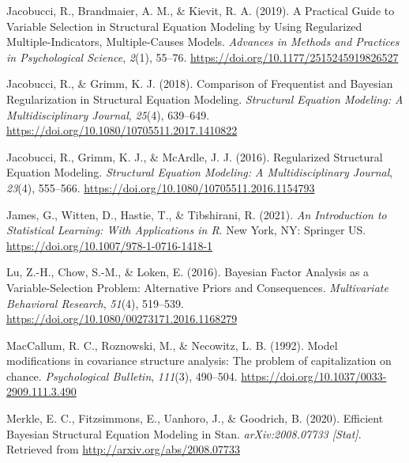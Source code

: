\documentclass[
  man, donotrepeattitle,floatsintext]{apa6}
\newlength{\cslhangindent}
\newlength{\cslentryspacingunit} %
\newenvironment{CSLReferences}[2] %
 {%
  \setlength{\parindent}{0pt}
  \ifodd #1
  \let\oldpar\par
  \def\par{\hangindent=\cslhangindent\oldpar}
  \fi
  \setlength{\parskip}{#2\cslentryspacingunit}
 }%
 {}
\begin{document}
\begin{CSLReferences}{1}{0}
\leavevmode{}%
Jacobucci, R., Brandmaier, A. M., \& Kievit, R. A. (2019). A {Practical} {Guide} to {Variable} {Selection} in {Structural} {Equation} {Modeling} by {Using} {Regularized} {Multiple}-{Indicators}, {Multiple}-{Causes} {Models}. \emph{Advances in Methods and Practices in Psychological Science}, \emph{2}(1), 55--76. \url{https://doi.org/10.1177/2515245919826527}

\leavevmode{}%
Jacobucci, R., \& Grimm, K. J. (2018). Comparison of {Frequentist} and {Bayesian} {Regularization} in {Structural} {Equation} {Modeling}. \emph{Structural Equation Modeling: A Multidisciplinary Journal}, \emph{25}(4), 639--649. \url{https://doi.org/10.1080/10705511.2017.1410822}

\leavevmode{}%
Jacobucci, R., Grimm, K. J., \& McArdle, J. J. (2016). Regularized {Structural} {Equation} {Modeling}. \emph{Structural Equation Modeling: A Multidisciplinary Journal}, \emph{23}(4), 555--566. \url{https://doi.org/10.1080/10705511.2016.1154793}

\leavevmode{}%
James, G., Witten, D., Hastie, T., \& Tibshirani, R. (2021). \emph{An {Introduction} to {Statistical} {Learning}: With {Applications} in {R}}. New York, NY: Springer US. \url{https://doi.org/10.1007/978-1-0716-1418-1}

\leavevmode{}%
Lu, Z.-H., Chow, S.-M., \& Loken, E. (2016). Bayesian {Factor} {Analysis} as a {Variable}-{Selection} {Problem}: {Alternative} {Priors} and {Consequences}. \emph{Multivariate Behavioral Research}, \emph{51}(4), 519--539. \url{https://doi.org/10.1080/00273171.2016.1168279}

\leavevmode{}%
MacCallum, R. C., Roznowski, M., \& Necowitz, L. B. (1992). Model modifications in covariance structure analysis: The problem of capitalization on chance. \emph{Psychological Bulletin}, \emph{111}(3), 490--504. \url{https://doi.org/10.1037/0033-2909.111.3.490}

\leavevmode{}%
Merkle, E. C., Fitzsimmons, E., Uanhoro, J., \& Goodrich, B. (2020). Efficient {Bayesian} {Structural} {Equation} {Modeling} in {Stan}. \emph{arXiv:2008.07733 {[}Stat{]}}. Retrieved from \url{http://arxiv.org/abs/2008.07733}


\end{CSLReferences}
\end{document}
